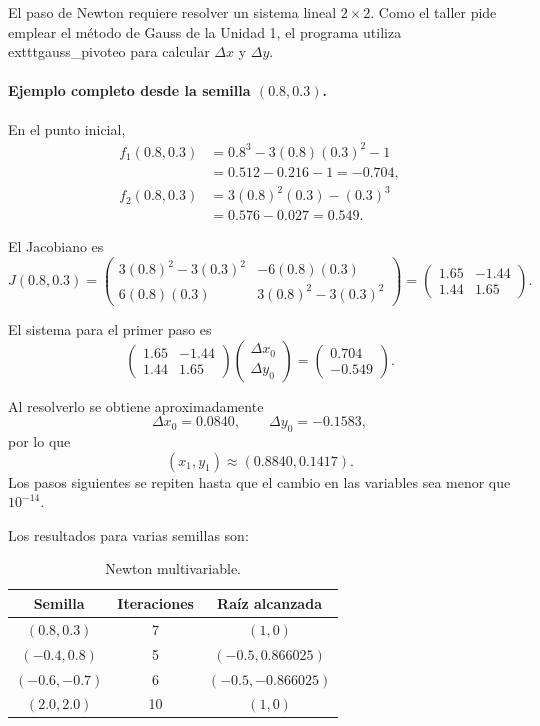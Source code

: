 \documentclass[11pt,a4paper]{article}
\begin{document}
El paso de Newton requiere resolver un sistema lineal $2\times2$. Como el taller pide emplear el método de Gauss de la Unidad 1, el programa utiliza 	exttt{gauss\_pivoteo} para calcular $\Delta x$ y $\Delta y$.

\paragraph{Ejemplo completo desde la semilla $(0.8,0.3)$.}

En el punto inicial,
\begin{align}
f_1(0.8,0.3)&=0.8^3-3(0.8)(0.3)^2-1\\
&=0.512-0.216-1=-0.704,\\
f_2(0.8,0.3)&=3(0.8)^2(0.3)-(0.3)^3\\
&=0.576-0.027=0.549.
\end{align}

El Jacobiano es
\begin{equation}
J(0.8,0.3)=
\begin{pmatrix}
3(0.8)^2-3(0.3)^2&-6(0.8)(0.3)\\
6(0.8)(0.3)&3(0.8)^2-3(0.3)^2
\end{pmatrix}
=
\begin{pmatrix}
1.65&-1.44\\
1.44&1.65
\end{pmatrix}.
\end{equation}

El sistema para el primer paso es
\begin{equation}
\begin{pmatrix}
1.65&-1.44\\
1.44&1.65
\end{pmatrix}
\begin{pmatrix}
\Delta x_0\\
\Delta y_0
\end{pmatrix}
=
\begin{pmatrix}
0.704\\
-0.549
\end{pmatrix}.
\end{equation}

Al resolverlo se obtiene aproximadamente
\[
\Delta x_0=0.0840,
\qquad
\Delta y_0=-0.1583,
\]
por lo que
\[
(x_1,y_1)\approx(0.8840,0.1417).
\]
Los pasos siguientes se repiten hasta que el cambio en las variables sea menor que $10^{-14}$.

Los resultados para varias semillas son:
\begin{table}[H]
\centering
\caption{Newton multivariable.}
\begin{tabular}{ccc}
\toprule
Semilla & Iteraciones & Raíz alcanzada\\
\midrule
$(0.8,0.3)$&7&$(1,0)$\\
$(-0.4,0.8)$&5&$(-0.5,0.866025)$\\
$(-0.6,-0.7)$&6&$(-0.5,-0.866025)$\\
$(2.0,2.0)$&10&$(1,0)$\\
\bottomrule
\end{tabular}
\end{table}
\end{document}
